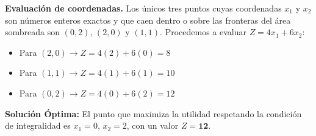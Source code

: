 \documentclass[10pt,a4paper]{article}
\begin{document}
\textbf{Evaluación de coordenadas.} Los únicos tres puntos cuyas coordenadas $x_1$ y $x_2$ son números enteros exactos y que caen dentro o sobre las fronteras del área sombreada son $(0,2)$, $(2,0)$ y $(1,1)$. Procedemos a evaluar $Z = 4x_1 + 6x_2$:
\begin{itemize}
    \item Para $(2,0) \rightarrow Z = 4(2) + 6(0) = 8$
    \item Para $(1,1) \rightarrow Z = 4(1) + 6(1) = 10$
    \item Para $(0,2) \rightarrow Z = 4(0) + 6(2) = 12$
\end{itemize}
\textbf{Solución Óptima:} El punto que maximiza la utilidad respetando la condición de integralidad es $x_1 = 0$, $x_2 = 2$, con un valor $Z = \mathbf{12}$.
\end{document}
